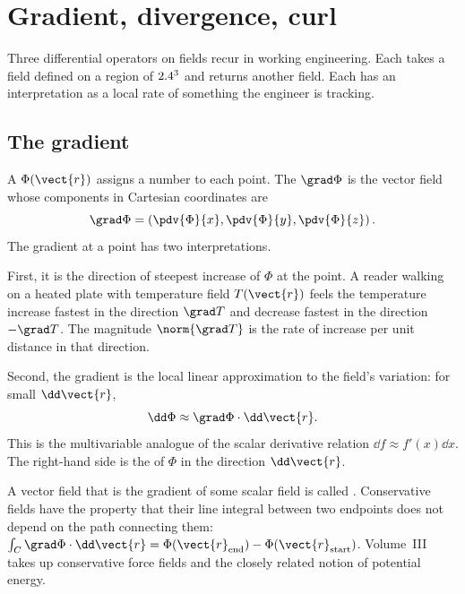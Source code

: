 \section{Gradient, divergence, curl}

Three differential operators on fields recur in working engineering.
Each takes a field defined on a region of $2.4^{3}$ and returns
another field. Each has an interpretation as a local rate of
something the engineer is tracking.

\subsection{The gradient}

A  $\Phi(\vect{r})$ assigns a number to each
point. The  $\grad\Phi$ is the vector field whose
components in Cartesian coordinates are
\[
\grad\Phi = \left(\pdv{\Phi}{x}, \pdv{\Phi}{y}, \pdv{\Phi}{z}\right).
\]
The gradient at a point has two interpretations.

First, it is the direction of steepest increase of $\Phi$ at the
point. A reader walking on a heated plate with temperature field
$T(\vect{r})$ feels the temperature increase fastest in the direction
$\grad T$ and decrease fastest in the direction $-\grad T$. The
magnitude $\norm{\grad T}$ is the rate of increase per unit distance
in that direction.

Second, the gradient is the local linear approximation to the field's
variation: for small $\dd\vect{r}$,
\[
\dd\Phi \approx \grad\Phi \cdot \dd\vect{r}.
\]
This is the multivariable analogue of the scalar derivative
relation $\dd f \approx f'(x) \dd x$. The right-hand side is the
 of $\Phi$ in the direction
$\dd\vect{r}$.

A vector field that is the gradient of some scalar field is called
. Conservative fields have the property that
their line integral between two endpoints does not depend on the
path connecting them: $\int_{C} \grad\Phi \cdot \dd\vect{r} =
\Phi(\vect{r}_{\text{end}}) - \Phi(\vect{r}_{\text{start}})$. Volume~III
takes up conservative force fields and the closely related notion of
potential energy.

